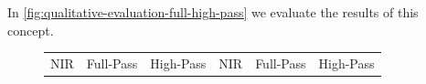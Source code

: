 In \autoref{fig:qualitative-evaluation-full-high-pass} we evaluate the results of this concept.

\begin{figure}[htp!]
    \centering
    \begin{tabularx}{\textwidth}{Y Y Y !{\space} Y Y Y}
        NIR                                                                                               & Full-Pass                                                                                               & High-Pass                                                                                               & NIR                                                                                               & Full-Pass                                                                                               & High-Pass                                                                                               \\

\end{tabularx}
\end{figure}
